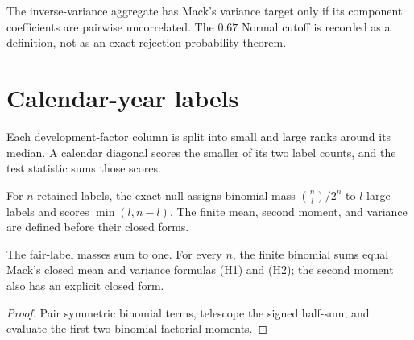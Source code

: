 \begin{definition}\label{def:mack1994-development-nominal}\leanok
The inverse-variance aggregate has Mack's variance target only if its component
coefficients are pairwise uncorrelated. The $0.67$ Normal cutoff is recorded as
a definition, not as an exact rejection-probability theorem.
\end{definition}

\section{Calendar-year labels}

\begin{definition}\label{def:mack1994-calendar}\leanok
Each development-factor column is split into small and large ranks around its
median. A calendar diagonal scores the smaller of its two label counts, and
the test statistic sums those scores.
\end{definition}

\begin{definition}\label{def:mack1994-calendar-null}\leanok
For $n$ retained labels, the exact null assigns binomial mass
$\binom nl/2^n$ to $l$ large labels and scores $\min(l,n-l)$. The finite mean,
second moment, and variance are defined before their closed forms.
\end{definition}

\begin{theorem}\label{thm:mack1994-calendar-moments}\leanok
{}
The fair-label masses sum to one. For every $n$, the finite binomial sums equal
Mack's closed mean and variance formulas (H1) and (H2); the second moment also
has an explicit closed form.
\end{theorem}
\begin{proof}\leanok Pair symmetric binomial terms, telescope the signed
half-sum, and evaluate the first two binomial factorial moments.
\end{proof}

